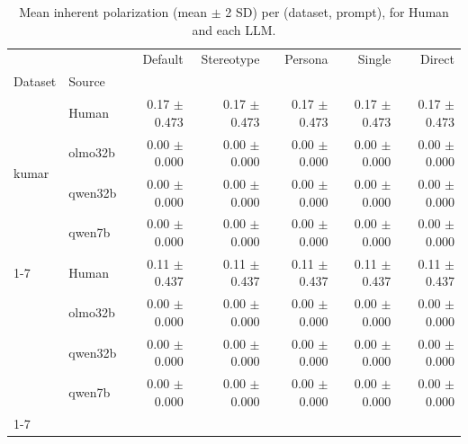 \begin{table}[t]
\small
\centering
\caption{Mean inherent polarization (mean $\pm$ 2 SD) per (dataset, prompt), for Human and each LLM.}
\label{tab:inherent-polarization}
\begin{tabular}{llrrrrr}
\toprule
 &  & Default & Stereotype & Persona & Single & Direct \\
Dataset & Source &  &  &  &  &  \\
\midrule
\multirow[t]{4}{*}{kumar} & Human & 0.17 $\pm$ 0.473 & 0.17 $\pm$ 0.473 & 0.17 $\pm$ 0.473 & 0.17 $\pm$ 0.473 & 0.17 $\pm$ 0.473 \\
 & olmo32b & 0.00 $\pm$ 0.000 & 0.00 $\pm$ 0.000 & 0.00 $\pm$ 0.000 & 0.00 $\pm$ 0.000 & 0.00 $\pm$ 0.000 \\
 & qwen32b & 0.00 $\pm$ 0.000 & 0.00 $\pm$ 0.000 & 0.00 $\pm$ 0.000 & 0.00 $\pm$ 0.000 & 0.00 $\pm$ 0.000 \\
 & qwen7b & 0.00 $\pm$ 0.000 & 0.00 $\pm$ 0.000 & 0.00 $\pm$ 0.000 & 0.00 $\pm$ 0.000 & 0.00 $\pm$ 0.000 \\
\cline{1-7}
\multirow[t]{4}{*}{sap} & Human & 0.11 $\pm$ 0.437 & 0.11 $\pm$ 0.437 & 0.11 $\pm$ 0.437 & 0.11 $\pm$ 0.437 & 0.11 $\pm$ 0.437 \\
 & olmo32b & 0.00 $\pm$ 0.000 & 0.00 $\pm$ 0.000 & 0.00 $\pm$ 0.000 & 0.00 $\pm$ 0.000 & 0.00 $\pm$ 0.000 \\
 & qwen32b & 0.00 $\pm$ 0.000 & 0.00 $\pm$ 0.000 & 0.00 $\pm$ 0.000 & 0.00 $\pm$ 0.000 & 0.00 $\pm$ 0.000 \\
 & qwen7b & 0.00 $\pm$ 0.000 & 0.00 $\pm$ 0.000 & 0.00 $\pm$ 0.000 & 0.00 $\pm$ 0.000 & 0.00 $\pm$ 0.000 \\
\cline{1-7}
\bottomrule
\end{tabular}
\end{table}

